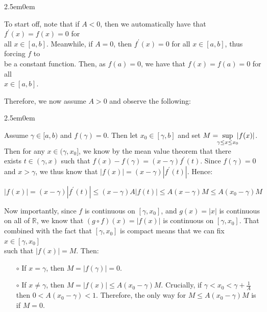 \documentclass{book}
\newcommand{\pracTwo}{
   \color{Orange}%
   \fontsize{12}{14}\selectfont%
}
\newenvironment{myIndent}{%
   \begin{adjustwidth}{2.5em}{0em}%
}{%
   \end{adjustwidth}%
}
\newcommand{\retTwo}{\hfill\bigbreak}
\begin{document}
{\begin{myIndent}\pracTwo
   To start off, note that if $A < 0$, then we automatically have that $f^\prime(x) = f(x) = 0$ for\\ all $x \in [a, b]$. Meanwhile, if $A = 0$, then $f^\prime(x) = 0$ for all $x \in [a, b]$, thus forcing $f$ to\\ be a constant function. Then, as $f(a) = 0$, we have that $f(x) = f(a) = 0$ for all\\ $x \in [a, b]$. \retTwo

   Therefore, we now assume $A > 0$ and observe the following:
   \begin{myIndent}
      Assume $\gamma \in [a, b)$ and $f(\gamma) = 0$. Then let $x_0 \in [\gamma, b]$ and set $M = \hspace{-0.45em}\sup\limits_{\gamma\leq x\leq x_0}\hspace{-0.4em}|f(x)|$.\\ 

      Then for any $x \in (\gamma, x_0]$, we know by the mean value theorem that there\\ exists $t \in (\gamma, x)$ such that $f(x) - f(\gamma) = (x-\gamma)f^\prime(t)$. Since $f(\gamma) = 0$\\ and $x > \gamma$, we thus know that $|f(x)| = (x - \gamma)|f^\prime(t)|$. Hence:

      {\center $|f(x)| = (x - \gamma)|f^\prime(t)| \leq (x - \gamma)A|f(t)| \leq A(x - \gamma)M \leq A(x_0 - \gamma)M$ \retTwo\par}

      Now importantly, since $f$ is continuous on $[\gamma, x_0]$, and $g(x) = |x|$ is continuous\\ on all of $\mathbb{R}$, we know that $(g\circ f)(x) = |f(x)|$ is continuous on $[\gamma, x_0]$. That\\ combined with the fact that $[\gamma, x_0]$ is compact means that we can fix $x \in [\gamma, x_0]$\\ such that $|f(x)| = M$. Then:
      \begin{itemize}
         \item[$\circ$] If $x = \gamma$, then $M = |f(\gamma)| = 0$.
         
         \newpage

         \item[$\circ$] If $x \neq \gamma$, then $M = |f(x)| \leq A(x_0 - \gamma)M$. Crucially, if $\gamma < x_0 < \gamma + \frac{1}{A}$\\ [1pt] then $0 < A(x_0 - \gamma) < 1$. Therefore, the only way for $M \leq A(x_0 - \gamma)M$ is\\ [2pt] if $M = 0$.\retTwo
      \end{itemize}


\end{myIndent}
\end{myIndent}}
\end{document}
